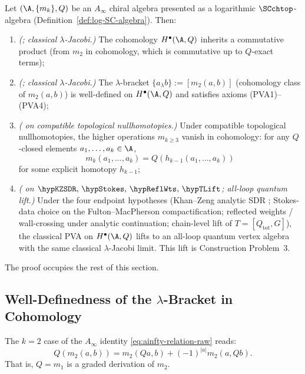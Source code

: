 \begin{theorem}
Let $(\A, \{m_k\}, Q)$ be an $A_\infty$ chiral algebra presented as a
logarithmic $\SCchtop$-algebra (Definition~\ref{def:log-SC-algebra}).
Then:
\begin{enumerate}[label=(\roman*)]
\item \emph{(\ClaimStatusProvedHere; classical $\lambda$-Jacobi.)}
The cohomology $H^\bullet(\A,Q)$ inherits a commutative product (from $m_2$ in cohomology, which is commutative up to $Q$-exact terms);

\item \emph{(\ClaimStatusProvedHere; classical $\lambda$-Jacobi.)}
The $\lambda$-bracket $\{a_\lambda b\} := [m_2(a,b)]$ (cohomology class of $m_2(a,b)$) is well-defined on $H^\bullet(\A,Q)$ and satisfies axioms (PVA1)--(PVA4);

\item \emph{(\ClaimStatusConditional{} on compatible topological
nullhomotopies.)}
Under compatible topological nullhomotopies, the higher
operations $m_{k \geq 3}$ vanish in cohomology: for any $Q$-closed
elements $a_1,\ldots,a_k \in \A$,
\[
m_k(a_1,\ldots,a_k) = Q(h_{k-1}(a_1,\ldots,a_k))
\]
for some explicit homotopy $h_{k-1}$;

\item \emph{(\ClaimStatusConditional{} on
$\hypKZSDR,\,\hypStokes,\,\hypReflWts,\,\hypTLift$; all-loop quantum lift.)}
Under the four endpoint hypotheses (Khan--Zeng analytic SDR
\cite{KZ25,Costello2011Renorm,CG17}; Stokes-data choice on the
Fulton--MacPherson compactification; reflected weights / wall-crossing
under analytic continuation; chain-level lift of
$T = [Q_{\mathrm{tot}}, G]$), the classical PVA on $H^\bullet(\A,Q)$
lifts to an all-loop quantum vertex algebra with the same classical
$\lambda$-Jacobi limit. This lift is Construction Problem~3.
\end{enumerate}
\end{theorem}

The proof occupies the rest of this section.

\subsection{Well-Definedness of the $\lambda$-Bracket in Cohomology}

\begin{proposition}
The $k=2$ case of the $A_\infty$ identity \eqref{eq:ainfty-relation-raw} reads:
\[
Q(m_2(a,b)) = m_2(Qa,b) + (-1)^{|a|} m_2(a,Qb).
\]
That is, $Q=m_1$ is a graded derivation of $m_2$.
\end{proposition}

